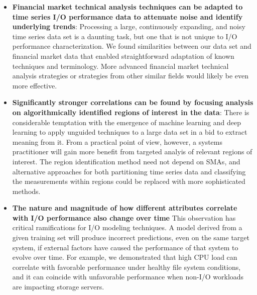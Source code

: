 \begin{itemize}[leftmargin=*]

\item \textbf{Financial market technical analysis techniques can be adapted
to time series I/O performance data to attenuate noise and identify
underlying trends}: Processing a large, continuously expanding, and noisy
time series data set is a daunting task, but one that is not unique to I/O
performance characterization.  We found similarities
between our data set and financial market data that enabled straightforward
adaptation of known techniques and terminology.  More advanced financial
market technical analysis strategies or strategies from other similar fields would likely be even more effective.

\item \textbf{Significantly stronger correlations can be found by focusing
analysis on algorithmically identified regions of interest in the data}:
There is considerable temptation with the emergence of machine learning and
deep learning to apply unguided techniques to a large data set in a bid to
extract meaning from it. From a practical point of view, however, a systems
practitioner will gain more benefit from targeted analyis of relevant regions of
interest.  The region identification method need not depend on SMAs, and alternative
approaches for both partitioning time series data and classifying the
measurements within regions could be replaced with more sophisticated methods.

\item \textbf{The nature and magnitude of how different attributes correlate
with I/O performance also change over time}  This observation has critical
ramifications for I/O modeling techniques.  A model derived from a given training set
will produce incorrect predictions, even on the same target system, if
external factors have caused the performance of that system to evolve over
time. For example, we demonstrated that high CPU load can correlate with favorable performance under healthy file system conditions, and it can coincide with unfavorable performance when non-I/O workloads are impacting storage servers.

\end{itemize}